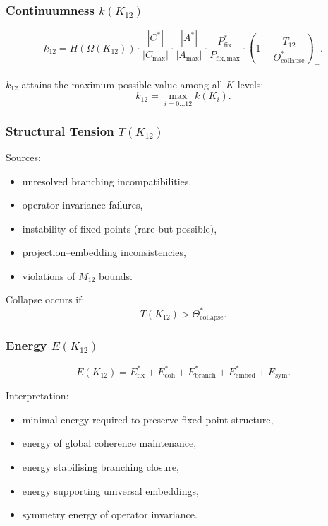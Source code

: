 \subsubsection{Continuumness $k(K_{12})$}

\[
k_{12} =
H(\Omega(K_{12}))
\cdot
\frac{|C^*|}{|C_{\max}|}
\cdot
\frac{|A^*|}{|A_{\max}|}
\cdot
\frac{P_{\mathrm{fix}}^*}{P_{\mathrm{fix,max}}}
\cdot
\left(1-\frac{T_{12}}{\Theta^*_{\mathrm{collapse}}}\right)_+.
\]

$k_{12}$ attains the maximum possible value among all $K$-levels:
\[
k_{12} = \max_{i=0\dots12} k(K_i).
\]

\subsubsection{Structural Tension $T(K_{12})$}

Sources:
\begin{itemize}
    \item unresolved branching incompatibilities,
    \item operator-invariance failures,
    \item instability of fixed points (rare but possible),
    \item projection–embedding inconsistencies,
    \item violations of $M_{12}$ bounds.
\end{itemize}

Collapse occurs if:
\[
T(K_{12}) > \Theta^*_{\mathrm{collapse}}.
\]

\subsubsection{Energy $E(K_{12})$}

\[
E(K_{12}) =
E_{\mathrm{fix}}^*
+E_{\mathrm{coh}}^*
+E_{\mathrm{branch}}^*
+E_{\mathrm{embed}}^*
+E_{\mathrm{sym}}.
\]

Interpretation:
\begin{itemize}
    \item minimal energy required to preserve fixed-point structure,
    \item energy of global coherence maintenance,
    \item energy stabilising branching closure,
    \item energy supporting universal embeddings,
    \item symmetry energy of operator invariance.
\end{itemize}

